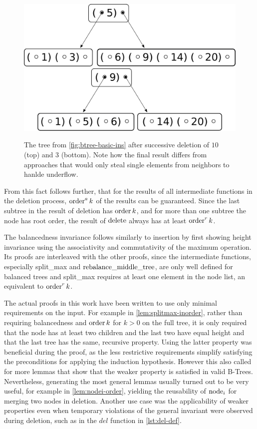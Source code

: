 \begin{figure}
    \centering
    \includegraphics[width=0.48\linewidth]{figures/btree-basic-ins9-ins1-del10.pdf}\\
    \vspace*{1cm}
    \includegraphics[width=0.48\linewidth]{figures/btree-basic-ins9-ins1-del10-del3.pdf}
    \caption{The tree from \autoref{fig:btree-basic-ins} after 
    successive deletion of $10$ (top) and $3$ (bottom).
    Note how the final result differs from approaches that would only steal single elements
    from neighbors to hanlde underflow.}
    \label{fig:btree-basic-del}
\end{figure}

From this fact follows further, that for the results of all intermediate functions
in the deletion process, $\operatorname{order}^a k$ of the results can be guaranteed.
Since the last subtree in the result of deletion has $\operatorname{order} k$,
and for more than one subtree the node has root order,
the result of $\operatorname{delete}$ always has at least $\operatorname{order}^r k$.

The balancedness invariance follows similarly to
insertion by first showing height invariance %
using the associativity and commutativity of the maximum operation.
Its proofs are interleaved with the other proofs,
since the intermediate functions, especially
split\_max and $\operatorname{rebalance\_middle\_tree}$, are only well defined for balanced trees
and split\_max requires at least one element in the node list, an equivalent
to $\operatorname{order}^r k$.

The actual proofs in this work have been written to use only
minimal requirements on the input.
For example in \autoref{lem:splitmax-inorder}, rather than
requiring balancedness and $\operatorname{order} k$ for $k > 0$ on the full tree,
it is only required that the node has at least two children
and the last two have equal height and that the last tree has the same, recursive property.
Using the latter property was beneficial during the proof,
as the less restrictive requirements simplify satisfying
the preconditions for applying the induction hypothesis.
However this also called for more lemmas that show that
the weaker property is satisfied in valid B-Trees.
Nevertheless, generating the most general lemmas usually turned out to be
very useful, for example in \autoref{lem:nodei-order}, yielding the reusability of $\operatorname{node}_i$ for
merging two nodes in deletion.
Another use case was the applicability of weaker properties
even when temporary violations
of the general invariant were observed during deletion,
such as in the $del$ function in \autoref{lst:del-def}.

